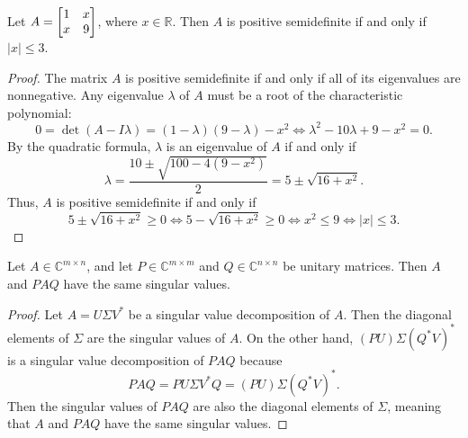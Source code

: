 \documentclass{homework}
\begin{document}
	\question Let $A = \left[\begin{matrix}1 & x \\ x & 9\end{matrix}\right]$, where $x \in \mathbb{R}$. Then $A$ is positive semidefinite if and only if $|x| \le 3$.
	
	\begin{proof}
		The matrix $A$ is positive semidefinite if and only if all of its eigenvalues are nonnegative. Any eigenvalue $\lambda$ of $A$ must be a root of the characteristic polynomial:
		\begin{equation*}
			0 = \det(A- I\lambda) = (1-\lambda)(9-\lambda) - x^2 \iff \lambda^2-10\lambda + 9 -x^2 =0.
		\end{equation*}
		By the quadratic formula, $\lambda$ is an eigenvalue of $A$ if and only if
		\begin{equation*}
			\lambda = \frac{10 \pm \sqrt{100 - 4(9-x^2)}}{2} = 5 \pm \sqrt{16+x^2}.
		\end{equation*}
		Thus, $A$ is positive semidefinite if and only if
		\begin{equation*}
			5\pm\sqrt{16+x^2} \ge0 \iff 5 - \sqrt{16+x^2} \ge 0 \iff x^2\le 9 \iff |x| \le 3.
		\end{equation*}
	\end{proof}
	
	\question Let $A \in\mathbb{C}^{m\times n}$, and let $P \in \mathbb{C}^{m\times m}$ and $Q \in\mathbb{C}^{n\times n}$ be unitary matrices. Then $A$ and $PAQ$ have the same singular values.
	\begin{proof}
		Let $A = U\Sigma V^*$ be a singular value decomposition of $A$. Then the diagonal elements of $\Sigma$ are the singular values of $A$. On the other hand, $(PU)\Sigma (Q^*V)^*$ is a singular value decomposition of $PAQ$ because
		\begin{equation*}
			PAQ = PU\Sigma V^*Q = (PU)\Sigma (Q^*V)^*.
		\end{equation*}
		Then the singular values of $PAQ$ are also the diagonal elements of $\Sigma$, meaning that $A$ and $PAQ$ have the same singular values.
	\end{proof}
	
\end{document}
